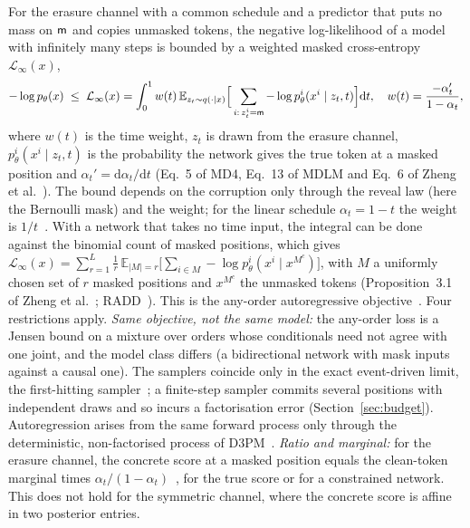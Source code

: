 For the erasure channel with a common schedule and a predictor that puts no mass on $\mathsf{m}$ and copies unmasked tokens, the negative log-likelihood of a model with infinitely many steps is bounded by a weighted masked cross-entropy $\mathcal L_\infty(x)$,
\begin{equation}
  -\log p_\theta(x)\;\le\;\mathcal L_\infty(x)=\int_0^1 w(t)\,
  \mathbb E_{z_t\sim q(\cdot\mid x)}\Big[\sum_{i:\,z_t^i=\mathsf{m}}-\log p_\theta^i(x^i\mid z_t,t)\Big]\mathrm dt,
  \quad w(t)=\frac{-\alpha_t'}{1-\alpha_t},
  \label{eq:objective}
\end{equation}
where $w(t)$ is the time weight, $z_t$ is drawn from the erasure channel, $p_\theta^i(x^i\mid z_t,t)$ is the probability the network gives the true token at a masked position and $\alpha_t'=\mathrm d\alpha_t/\mathrm dt$ (Eq.~5 of MD4, Eq.~13 of MDLM and Eq.~6 of Zheng et al.~\cite{arXiv:2406.04329,arXiv:2406.07524,arXiv:2409.02908}). %
The bound depends on the corruption only through the reveal law (here the Bernoulli mask) and the weight; for the linear schedule $\alpha_t=1-t$ the weight is $1/t$~\cite{arXiv:2502.09992}. With a network that takes no time input, the integral can be done against the binomial count of masked positions, which gives $\mathcal L_\infty(x)=\sum_{r=1}^{L}\frac1r\,\mathbb E_{|M|=r}\big[\sum_{i\in M}-\log p_\theta^i(x^i\mid x^{M^c})\big]$, with $M$ a uniformly chosen set of $r$ masked positions and $x^{M^c}$ the unmasked tokens (Proposition~3.1 of Zheng et al.~\cite{arXiv:2409.02908}; RADD~\cite{arXiv:2406.03736}). This is the any-order autoregressive objective~\cite{arXiv:2406.03736,arXiv:2110.02037}. %
Four restrictions apply.
\emph{Same objective, not the same model:} the any-order loss is a Jensen bound on a mixture over orders whose conditionals need not agree with one joint, and the model class differs (a bidirectional network with mask inputs against a causal one). The samplers coincide only in the exact event-driven limit, the first-hitting sampler~\cite{arXiv:2409.02908}; a finite-step sampler commits several positions with independent draws and so incurs a factorisation error (Section~\ref{sec:budget}). Autoregression arises from the same forward process only through the deterministic, non-factorised process of D3PM~\cite{arXiv:2107.03006}. %
\emph{Ratio and marginal:} for the erasure channel, the concrete score at a masked position equals the clean-token marginal times $\alpha_t/(1-\alpha_t)$~\cite{arXiv:2406.03736,arXiv:2406.04329}, for the true score or for a constrained network. This does not hold for the symmetric channel, where the concrete score is affine in two posterior entries. %

